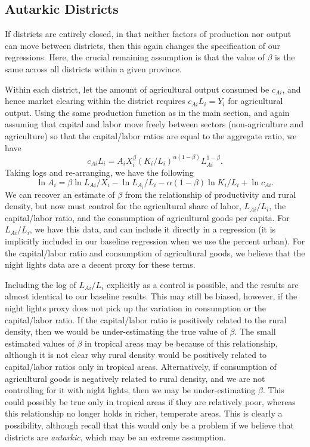 \documentclass[11pt]{article}
\begin{document}
\subsection{Autarkic Districts}
If districts are entirely closed, in that neither factors of production nor output can move between districts, then this again changes the specification of our regressions. Here, the crucial remaining assumption is that the value of $\beta$ is the same across all districts within a given province. 

Within each district, let the amount of agricultural output consumed be $c_{Ai}$, and hence market clearing within the district requires $c_{Ai} L_i = Y_i$ for agricultural output. Using the same production function as in the main section, and again assuming that capital and labor move freely between sectors (non-agriculture and agriculture) so that the capital/labor ratios are equal to the aggregate ratio, we have
\begin{equation}
    c_{Ai} L_i = A_i X_i^{\beta} \left(K_i/L_i\right)^{\alpha(1-\beta)} L_{Ai}^{1-\beta}. \nonumber
\end{equation}
Taking logs and re-arranging, we have the following
\begin{equation}
    \ln A_i = \beta \ln L_{Ai}/X_i - \ln L_{A_i}/L_i - \alpha(1-\beta) \ln K_{i}/L_{i} + \ln c_{Ai}. \nonumber
\end{equation}
We can recover an estimate of $\beta$ from the relationship of productivity and rural density, but now must control for the agricultural share of labor, $L_{Ai}/L_i$, the capital/labor ratio, and the consumption of agricultural goods per capita. For $L_{Ai}/L_i$, we have this data, and can include it directly in a regression (it is implicitly included in our baseline regression when we use the percent urban). For the capital/labor ratio and consumption of agricultural goods, we believe that the night lights data are a decent proxy for these terms.

Including the log of $L_{Ai}/L_i$ explicitly as a control is possible, and the results are almost identical to our baseline results. This may still be biased, however, if the night lights proxy does not pick up the variation in consumption or the capital/labor ratio. If the capital/labor ratio is positively related to the rural density, then we would be under-estimating the true value of $\beta$. The small estimated values of $\beta$ in tropical areas may be because of this relationship, although it is not clear why rural density would be positively related to capital/labor ratios only in tropical areas. Alternatively, if consumption of agricultural goods is negatively related to rural density, and we are not controlling for it with night lights, then we may be under-estimating $\beta$. This could possibly be true only in tropical areas if they are relatively poor, whereas this relationship no longer holds in richer, temperate areas. This is clearly a possibility, although recall that this would only be a problem if we believe that districts are \textit{autarkic}, which may be an extreme assumption.
\end{document}
